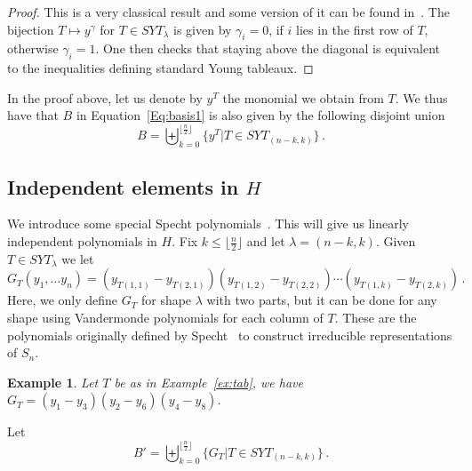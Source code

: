 \documentclass[10pt,a4paper]{article}
\newtheorem{example}{Example}[section]
\begin{document}
\begin{proof}
This is a very classical result and some version of it can be found in~\cite{Stanley}. The bijection $T\mapsto y^\gamma$ for $T\in SYT_\lambda$ is  given by $\gamma_i=0$, if $i$ lies in the first row of $T$, otherwise $\gamma_i=1$. One then checks that staying above the diagonal is equivalent to the inequalities defining standard  Young tableaux.
\end{proof}

In the proof above, let us denote by  $y^T$ the monomial we obtain from $T$. We thus have that $B$ in  Equation~\eqref{Eq:basis1} is also given by the following disjoint union
\begin{equation}\label{Eq:BinT}
	B=\biguplus_{k=0}^{ \lfloor \frac{n}{2} \rfloor} \big\{ y^T \big| T \in SYT_{(n-k,k)}\big\}\,.
\end{equation}


\subsection{Independent elements in $H$}\label{ss:specht}
We introduce some special Specht polynomials~\cite{Specht}. This will give us linearly independent polynomials in $H$.
Fix $k\le \lfloor \frac{n}{2} \rfloor$ and let $\lambda=(n-k,k)$. Given $T\in SYT_\lambda$ we let
\begin{equation}\label{eq:Gpoly}
 G_T(y_1,\ldots y_n) = (y_{T(1,1)} - y_{T(2,1)})  (y_{T(1,2)} - y_{T(2,2)}) \cdots  (y_{T(1,k)} - y_{T(2,k)}) \,.
 \end{equation}
  Here, we only define $G_T$ for shape $\lambda$ with two parts, but it can be done for any shape using Vandermonde polynomials for each column of $T$. 
  These are  the polynomials originally  defined by Specht~\cite{Specht} to construct irreducible representations of $S_n$.
\begin{example}
  Let $T$ be as in Example~\ref{ex:tab}, we have $G_T=(y_1-y_3)(y_2-y_6)(y_4-y_8)$.
\end{example}
Let
\begin{equation}\label{Eq:B2inT}
	B'=\biguplus_{k=0}^{ \lfloor \frac{n}{2} \rfloor} \big\{ G_T \big| T \in SYT_{(n-k,k)}\big\}\,.
\end{equation}
\end{document}
